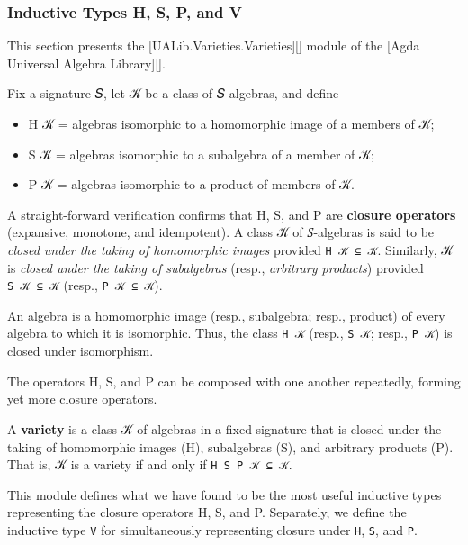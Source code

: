 \subsubsection{Inductive Types H, S, P, and
V}\label{inductive-types-h-s-p-and-v}

This section presents the {[}UALib.Varieties.Varieties{]}{[}{]} module
of the {[}Agda Universal Algebra Library{]}{[}{]}.

Fix a signature 𝑆, let 𝒦 be a class of 𝑆-algebras, and define

\begin{itemize}
\tightlist
\item
  H 𝒦 = algebras isomorphic to a homomorphic image of a members of 𝒦;
\item
  S 𝒦 = algebras isomorphic to a subalgebra of a member of 𝒦;
\item
  P 𝒦 = algebras isomorphic to a product of members of 𝒦.
\end{itemize}

A straight-forward verification confirms that H, S, and P are
\textbf{closure operators} (expansive, monotone, and idempotent). A
class 𝒦 of 𝑆-algebras is said to be \emph{closed under the taking of
homomorphic images} provided \texttt{H\ 𝒦\ ⊆\ 𝒦}. Similarly, 𝒦 is
\emph{closed under the taking of subalgebras} (resp., \emph{arbitrary
products}) provided \texttt{S\ 𝒦\ ⊆\ 𝒦} (resp., \texttt{P\ 𝒦\ ⊆\ 𝒦}).

An algebra is a homomorphic image (resp., subalgebra; resp., product) of
every algebra to which it is isomorphic. Thus, the class \texttt{H\ 𝒦}
(resp., \texttt{S\ 𝒦}; resp., \texttt{P\ 𝒦}) is closed under
isomorphism.

The operators H, S, and P can be composed with one another repeatedly,
forming yet more closure operators.

A \textbf{variety} is a class 𝒦 of algebras in a fixed signature that is
closed under the taking of homomorphic images (H), subalgebras (S), and
arbitrary products (P). That is, 𝒦 is a variety if and only if
\texttt{H\ S\ P\ 𝒦\ ⊆\ 𝒦}.

This module defines what we have found to be the most useful inductive
types representing the closure operators H, S, and P. Separately, we
define the inductive type \texttt{V} for simultaneously representing
closure under \texttt{H}, \texttt{S}, and \texttt{P}.

